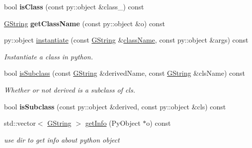 \begin{Indent}
\begin{DoxyCompactItemize}
\mbox{\label{classrev_1_1_python_a_p_i_abfc903dfc0cad41800bcd16f31053abf}} 
bool {\bfseries is\+Class} (const py\+::object \&class\+\_\+) const
\item 
\mbox{\label{classrev_1_1_python_a_p_i_a0e85a137bdce3ada0d30712a0b98ab42}} 
\mbox{\hyperlink{classrev_1_1_g_string}{G\+String}} {\bfseries get\+Class\+Name} (const py\+::object \&o) const
\item 
py\+::object \mbox{\hyperlink{classrev_1_1_python_a_p_i_a35a8574cc24babeadf94a62e720c0866}{instantiate}} (const \mbox{\hyperlink{classrev_1_1_g_string}{G\+String}} \&\mbox{\hyperlink{classrev_1_1_python_a_p_i_ab8d7ecd519d9d930bc7024a9e222218e}{class\+Name}}, const py\+::object \&args) const
\begin{DoxyCompactList}\small\item\em Instantiate a class in python. \end{DoxyCompactList}\item 
bool \mbox{\hyperlink{classrev_1_1_python_a_p_i_abf0f6260ad9e5676cbae1cee40f33430}{is\+Subclass}} (const \mbox{\hyperlink{classrev_1_1_g_string}{G\+String}} \&derived\+Name, const \mbox{\hyperlink{classrev_1_1_g_string}{G\+String}} \&cls\+Name) const
\begin{DoxyCompactList}\small\item\em Whether or not derived is a subclass of cls. \end{DoxyCompactList}\item 
\mbox{\label{classrev_1_1_python_a_p_i_ac423ce66f6dacf55f6e8866530acd58f}} 
bool {\bfseries is\+Subclass} (const py\+::object \&derived, const py\+::object \&cls) const
\item 
\mbox{\label{classrev_1_1_python_a_p_i_a446a468b0bd4304a3dab0a8028163892}} 
std\+::vector$<$ \mbox{\hyperlink{classrev_1_1_g_string}{G\+String}} $>$ \mbox{\hyperlink{classrev_1_1_python_a_p_i_a446a468b0bd4304a3dab0a8028163892}{get\+Info}} (Py\+Object $\ast$o) const
\begin{DoxyCompactList}\small\item\em use dir to get info about python object \end{DoxyCompactList}\item 
\mbox{\label{classrev_1_1_python_a_p_i_a07a00036ee0daee74060b239be97c7a3}} 

\end{DoxyCompactItemize}
\end{Indent}
